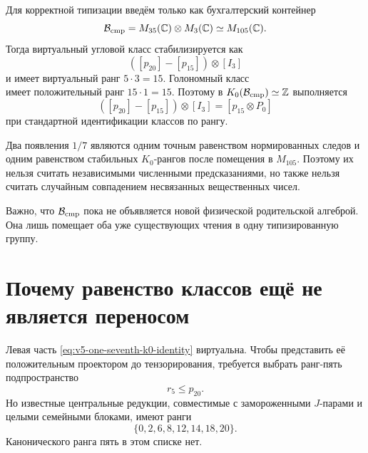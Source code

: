 Для корректной типизации введём только как бухгалтерский контейнер
\begin{equation}
 \mathcal B_{\rm cmp}=M_{35}(\mathbb C)\otimes M_3(\mathbb C)
 \simeq M_{105}(\mathbb C).
 \label{eq:v5-one-seventh-comparison-algebra}
\end{equation}
Тогда виртуальный угловой класс стабилизируется как
\begin{equation}
 ([p_{20}]-[p_{15}])\otimes[I_3]
\end{equation}
и имеет виртуальный ранг $5\cdot3=15$. Голономный класс
\begin{equation}
 [p_{15}\otimes P_0]
\end{equation}
имеет положительный ранг $15\cdot1=15$. Поэтому в
$K_0(\mathcal B_{\rm cmp})\simeq\mathbb Z$ выполняется
\begin{equation}
 \boxed{
 ([p_{20}]-[p_{15}])\otimes[I_3]
 =[p_{15}\otimes P_0]
 }
 \label{eq:v5-one-seventh-k0-identity}
\end{equation}
при стандартной идентификации классов по рангу.

\begin{proposition}
Два появления $1/7$ являются одним точным равенством нормированных следов
и одним равенством стабильных $K_0$-рангов после помещения в
$M_{105}$. Поэтому их нельзя считать независимыми численными
предсказаниями, но также нельзя считать случайным совпадением несвязанных
вещественных чисел.
\end{proposition}

Важно, что $\mathcal B_{\rm cmp}$ пока не объявляется новой физической
родительской алгеброй. Она лишь помещает оба уже существующих чтения в
одну типизированную группу.

\section{Почему равенство классов ещё не является переносом}

Левая часть \eqref{eq:v5-one-seventh-k0-identity} виртуальна. Чтобы
представить её положительным проектором до тензорирования, требуется
выбрать ранг-пять подпространство
\begin{equation}
 r_5\le p_{20}.
\end{equation}
Но известные центральные редукции, совместимые с замороженными
$J$-парами и целыми семейными блоками, имеют ранги
\begin{equation}
 \{0,2,6,8,12,14,18,20\}.
 \label{eq:v5-one-seventh-known-ranks}
\end{equation}
Канонического ранга пять в этом списке нет.

